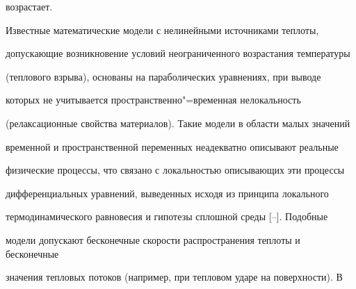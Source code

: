возрастает.











\smallskip




Известные математические модели с нелинейными источниками теплоты,

допускающие возникновение условий неограниченного возрастания температуры

(теплового взрыва), основаны на параболических уравнениях, при выводе

которых не учитывается пространственно"=временная нелокальность

(релаксационные свойства материалов). Такие модели в области малых значений

временной и пространственной переменных неадекватно описывают реальные

физические процессы, что связано с локальностью описывающих эти процессы

дифференциальных уравнений, выведенных исходя из принципа локального

термодинамического равновесия и гипотезы сплошной среды [--]. Подобные

модели допускают бесконечные скорости распространения теплоты и бесконечные

значения тепловых потоков (например, при тепловом ударе на поверхности). В

